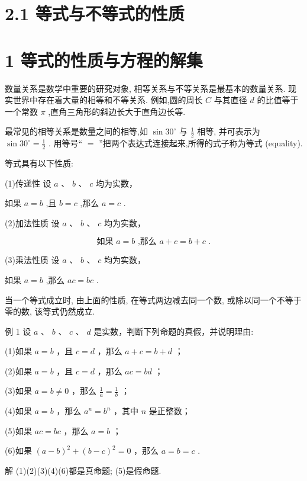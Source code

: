 \documentclass[10pt]{article}
\begin{document}
\section*{2.1 等式与不等式的性质}

\section*{1 等式的性质与方程的解集}

数量关系是数学中重要的研究对象, 相等关系与不等关系是最基本的数量关系. 现实世界中存在着大量的相等和不等关系. 例如,圆的周长 \(C\) 与其直径 \(d\) 的比值等于一个常数 \(\pi\) ,直角三角形的斜边长大于直角边长等.

最常见的相等关系是数量之间的相等,如 \(\sin {30}^{ \circ  }\) 与 \(\frac{1}{2}\) 相等, 并可表示为 \(\sin {30}^{ \circ  } = \frac{1}{2}\) . 用等号“ \(=\) ”把两个表达式连接起来,所得的式子称为等式 (equality).

等式具有以下性质:

(1)传递性 设 \(a\text{ 、 }b\text{ 、 }c\) 均为实数，

如果 \(a = b\) ,且 \(b = c\) ,那么 \(a = c\) .

(2)加法性质 设 \(a\text{ 、 }b\text{ 、 }c\) 均为实数，

\[
\text{ 如果 }a = b\text{ ,那么 }a + c = b + c\text{ . }
\]

(3)乘法性质 设 \(a\text{ 、 }b\text{ 、 }c\) 均为实数，

如果 \(a = b\) ,那么 \({ac} = {bc}\) .

当一个等式成立时, 由上面的性质, 在等式两边减去同一个数, 或除以同一个不等于零的数, 该等式仍然成立.

例 1 设 \(a\text{ 、 }b\text{ 、 }c\text{ 、 }d\) 是实数，判断下列命题的真假，并说明理由:

(1)如果 \(a = b\) ，且 \(c = d\) ，那么 \(a + c = b + d\) ；

(2)如果 \(a = b\) ，且 \(c = d\) ，那么 \({ac} = {bd}\) ；

(3)如果 \(a = b \neq  0\) ，那么 \(\frac{1}{a} = \frac{1}{b}\) ；

(4)如果 \(a = b\) ，那么 \({a}^{n} = {b}^{n}\) ，其中 \(n\) 是正整数；



(5)如果 \({ac} = {bc}\) ，那么 \(a = b\) ；

(6)如果 \({\left( a - b\right) }^{2} + {\left( b - c\right) }^{2} = 0\) ，那么 \(a = b = c\) .

解 (1)(2)(3)(4)(6)都是真命题; (5)是假命题.
\end{document}
